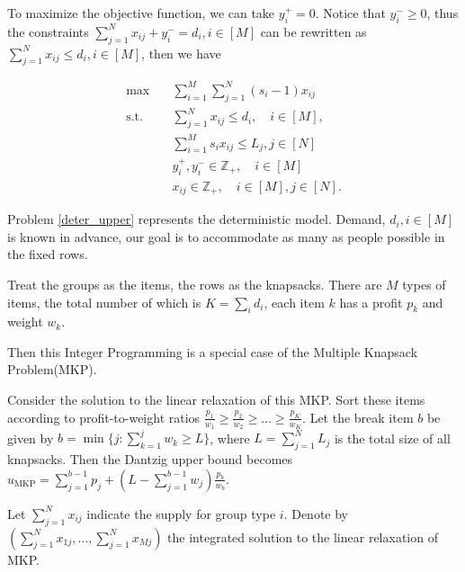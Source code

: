To maximize the objective function, we can take $y_i^{+} = 0$. Notice that $y_{i}^{-} \geq 0$, thus the constraints $\sum_{j= 1}^{N} x_{ij} + y_{i}^{-} = d_{i}, i \in [M]$ can be rewritten as $\sum_{j= 1}^{N} x_{ij} \leq d_{i}, i \in [M]$, then we have

\begin{equation}\label{deter_upper}
  \begin{aligned}
  \max \quad & \sum_{i=1}^{M}  \sum_{j= 1}^{N} (s_i-1) x_{ij} \\
  \text {s.t.} \quad & \sum_{j= 1}^{N} x_{ij} \leq d_{i}, \quad i \in [M], \\
  & \sum_{i=1}^{M} s_{i} x_{ij} \leq L_j, j \in [N] \\
  & y_{i}^{+}, y_{i}^{-} \in \mathbb{Z}_{+}, \quad i \in [M] \\
  & x_{ij} \in \mathbb{Z}_{+}, \quad i \in [M], j \in [N].
  \end{aligned}
\end{equation}

Problem \eqref{deter_upper} represents the deterministic model. Demand, $d_i, i \in [M]$ is known in advance, our goal is to accommodate as many as people possible in the fixed rows.

Treat the groups as the items, the rows as the knapsacks. There are $M$ types of items, the total number of which is $K = \sum_{i} d_i$, each item $k$ has a profit $p_k$ and weight $w_k$. 


Then this Integer Programming is a special case of the Multiple Knapsack Problem(MKP). 


Consider the solution to the linear relaxation of this MKP. Sort these items according to profit-to-weight ratios $\frac{p_1}{w_1} \geq \frac{p_2}{w_2} \geq \ldots \geq \frac{p_K}{w_K}$.
Let the break item $b$ be given by $b=\min \{j: \sum_{k=1}^j w_k \geq L\}$, where $L = \sum_{j=1}^{N} L_j$ is the total size of all knapsacks. Then the Dantzig upper bound \cite{dantzig1957discrete} becomes 
$u_{\mathrm{MKP}}=\sum_{j=1}^{b-1} p_j+\left(L-\sum_{j=1}^{b-1} w_j\right) \frac{p_b}{w_b}$. 

Let $\sum_{j=1}^{N} x_{ij}$ indicate the supply for group type $i$. Denote by $(\sum_{j=1}^{N} x_{1j},\ldots, \sum_{j=1}^{N} x_{Mj})$ the integrated solution to the linear relaxation of MKP.

